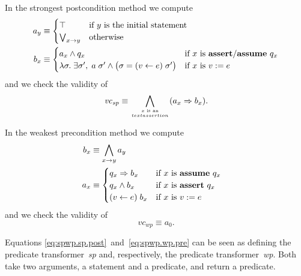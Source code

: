 \documentclass[a4paper]{article}
\newcommand{\limp}{\Rightarrow}
\newcommand{\tru}{\top}
\theoremstyle{slanted}
\theoremstyle{definition}
\theoremstyle{remark}
\begin{document}
In the strongest postcondition method we compute
\begin{align}
a_y &\equiv 
  \begin{cases}
  \tru & \text{if $y$ is the initial statement} \\
  \bigvee_{x \to y} & \text{otherwise}
  \end{cases} \label{eq:spwp.sp.pre}\\
b_x &\equiv
  \begin{cases}
  a_x \land q_x & \text{if $x$ is \textbf{assert}/\textbf{assume}~$q_x$} \\
  \lambda\sigma.\; \exists\sigma',\;a\;\sigma' \land
    \bigl( \sigma=(v\gets e)\;\sigma' \bigr)
    & \text{if $x$ is $v:=e$}
  \end{cases}
  \label{eq:spwp.sp.post}
\end{align}
and we check the validity of
\begin{equation}
\mathit{vc}_\mathit{sp} \equiv \bigwedge_{
  \genfrac{}{}{0pt}{}{\text{$x$ is an}}{text{assertion}} }
  (a_x \limp b_x). \label{eq:spwp.sp.vc}
\end{equation}

In the weakest precondition method we compute
\begin{align}
b_x &\equiv \bigwedge_{x \to y} a_y &  \label{eq:spwp.wp.post}\\
a_x &\equiv 
  \begin{cases}
  q_x \limp b_x &\text{if $x$ is \textbf{assume}~$q_x$}\\
  q_x \land b_x &\text{if $x$ is \textbf{assert}~$q_x$}\\
  (v\gets e)\;b_x &\text{if $x$ is $v:=e$}
  \end{cases}
  \label{eq:spwp.wp.pre}
\end{align}
and we check the validity of
\begin{equation}
\mathit{vc}_\mathit{wp}\equiv a_0.  \label{eq:spwp.wp.vc}
\end{equation}

Equations \eqref{eq:spwp.sp.post}~and~\eqref{eq:spwp.wp.pre}
can be seen as defining the predicate transformer~\textit{sp} and,
respectively, the predicate transformer~\textit{wp}. Both take two
arguments, a statement and a predicate, and return a predicate.
\end{document}
